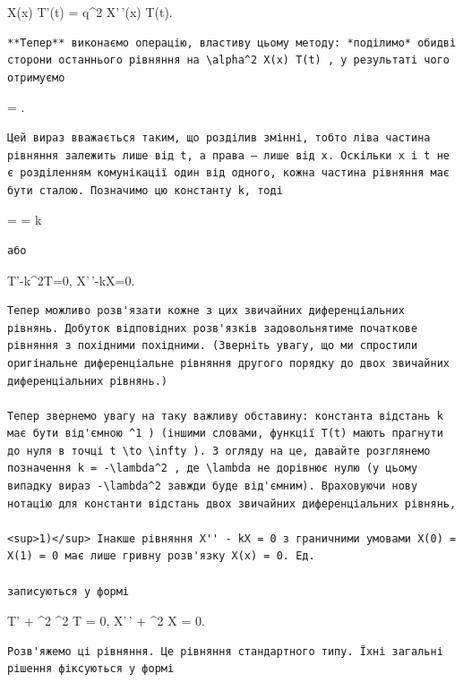 \documentclass[
  ukrainian,
]{article}
\begin{document}
X(x) T'(t) = q\^{}2 X'\,'(x) T(t).

\begin{verbatim}
**Тепер** виконаємо операцію, властиву цьому методу: *поділимо* обидві сторони останнього рівняння на \alpha^2 X(x) T(t) , у результаті чого отримуємо
\end{verbatim}

 = .

\begin{verbatim}
Цей вираз вважається таким, що розділив змінні, тобто ліва частина рівняння залежить лише від t, а права — лише від x. Оскільки x і t не є розділенням комунікації один від одного, кожна частина рівняння має бути сталою. Позначимо цю константу k, тоді
\end{verbatim}

 =  = k

\begin{verbatim}
або
\end{verbatim}

T'-k\alpha\^{}2T=0, X'\,'-kX=0.

\begin{verbatim}
Тепер можливо розв'язати кожне з цих звичайних диференціальних рівнянь. Добуток відповідних розв'язків задовольнятиме початкове рівняння з похідними похідними. (Зверніть увагу, що ми спростили оригінальне диференціальне рівняння другого порядку до двох звичайних диференціальних рівнянь.)

Тепер звернемо увагу на таку важливу обставину: константа відстань k має бути від'ємною ^1 ) (іншими словами, функції T(t) мають прагнути до нуля в точці t \to \infty ). З огляду на це, давайте розглянемо позначення k = -\lambda^2 , де \lambda не дорівнює нулю (у цьому випадку вираз -\lambda^2 завжди буде від'ємним). Враховуючи нову нотацію для константи відстань двох звичайних диференціальних рівнянь,

<sup>1)</sup> Інакше рівняння X'' - kX = 0 з граничними умовами X(0) = X(1) = 0 має лише гривну розв'язку X(x) = 0. Ед.

записуються у формі
\end{verbatim}

T' + \lambda\^{}2 \alpha\^{}2 T = 0, X'\,' + \lambda\^{}2 X = 0.

\begin{verbatim}
Розв'яжемо ці рівняння. Це рівняння стандартного типу. Їхні загальні рішення фіксуються у формі
\end{verbatim}
\end{document}
